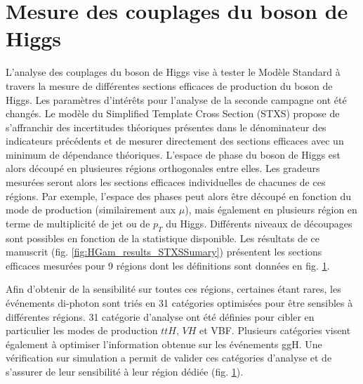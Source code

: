 \section{Mesure des couplages du boson de Higgs}

L'analyse des couplages du boson de Higgs vise à tester le Modèle Standard à travers la mesure de différentes sections efficaces de production du boson de Higgs.
Les paramètres d'intérêts pour l'analyse de la seconde campagne ont été changés.
Le modèle du  Simplified Template Cross Section (STXS) propose de s'affranchir des incertitudes théoriques présentes dans le dénominateur des indicateurs précédents et de mesurer directement des sections efficaces avec un minimum de dépendance théoriques.
L'espace de phase du boson de Higgs est alors découpé en plusieures régions orthogonales entre elles.
Les gradeurs mesurées seront alors les sections efficaces individuelles de chacunes de ces régions.
Par exemple, l'espace des phases peut alors être découpé en fonction du mode de production (similairement aux $\mu$), mais également en plusieurs région en terme de multiplicité de jet ou de $p_T$ du Higgs.
Différents niveaux de découpages sont possibles en fonction de la statistique disponible.
Les résultats de ce manuscrit (fig. \ref{fig:HGam_results_STXSSumary}) présentent les sections efficaces mesurées pour 9 régions dont les définitions sont données en fig. \ref{}.

Afin d'obtenir de la sensibilité sur toutes ces régions, certaines étant rares, les événements di-photon sont triés en 31 catégories optimisées pour être sensibles à différentes régions.
31 catégorie d'analyse ont été définies pour cibler en particulier les modes de production $ttH$, $VH$ et VBF.
Plusieurs catégories visent également à optimiser l'information obtenue sur les événements ggH.
Une vérification sur simulation a permit de valider ces catégories d'analyse et de s'assurer de leur sensibilité à leur région dédiée (fig. \ref{}).

